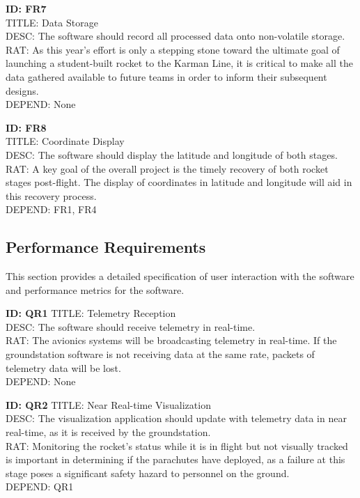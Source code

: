 \documentclass[onecolumn, draftclsnofoot,10pt, compsoc]{IEEEtran}
\begin{document}
			\noindent
			\textbf{ID: FR7}\\
			TITLE: Data Storage\\
			DESC: The software should record all processed data onto non-volatile storage.\\
			RAT: As this year's effort is only a stepping stone toward the ultimate goal of launching a student-built rocket to the Karman Line, it is critical to make all the data gathered available to future teams in order to inform their subsequent designs.\\
			DEPEND: None
      
      \noindent
			\textbf{ID: FR8}\\
			TITLE: Coordinate Display\\
			DESC: The software should display the latitude and longitude of both stages.\\
			RAT: A key goal of the overall project is the timely recovery of both rocket stages post-flight.
        The display of coordinates in latitude and longitude will aid in this recovery process.\\
			DEPEND: FR1, FR4
      
		
		\subsection{Performance Requirements}
			This section provides a detailed specification of user interaction with the software and performance metrics for the software.
		
			\noindent
			\textbf{ID: QR1}
			TITLE: Telemetry Reception\\
			DESC: The software should receive telemetry in real-time.\\
			RAT: The avionics systems will be broadcasting telemetry in real-time. 
				If the groundstation software is not receiving data at the same rate, packets of telemetry data will be lost.\\
			DEPEND: None
			
			\noindent
			\textbf{ID: QR2}
			TITLE: Near Real-time Visualization\\
			DESC: The visualization application should update with telemetry data in near real-time, as it is received by the groundstation.\\
			RAT: Monitoring the rocket's status while it is in flight but not visually tracked is important in determining if the parachutes have deployed, as a failure at this stage poses a significant safety hazard to personnel on the ground. \\
			DEPEND: QR1
			
\end{document}
